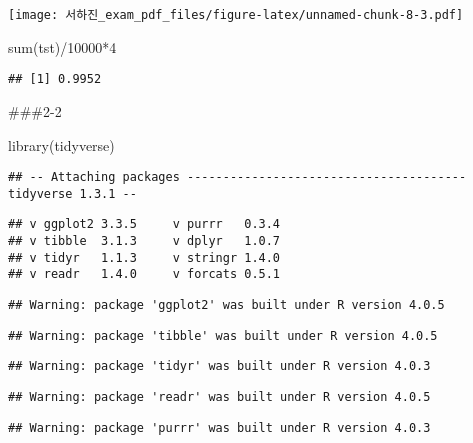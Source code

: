 \documentclass[
]{article}
\newenvironment{Shaded}{\begin{snugshade}}{\end{snugshade}}
\newcommand{\DecValTok}[1]{\textcolor[rgb]{0.00,0.00,0.81}{#1}}
\newcommand{\FunctionTok}[1]{\textcolor[rgb]{0.00,0.00,0.00}{#1}}
\newcommand{\NormalTok}[1]{#1}
\newcommand{\SpecialCharTok}[1]{\textcolor[rgb]{0.00,0.00,0.00}{#1}}
\begin{document}
\texttt{[image: 서하진\_exam\_pdf\_files/figure-latex/unnamed-chunk-8-3.pdf]}

\begin{Shaded}
\begin{Highlighting}[]
\FunctionTok{sum}\NormalTok{(tst)}\SpecialCharTok{/}\DecValTok{10000}\SpecialCharTok{*}\DecValTok{4}
\end{Highlighting}
\end{Shaded}

\begin{verbatim}
## [1] 0.9952
\end{verbatim}

\#\#\#2-2

\begin{Shaded}
\begin{Highlighting}[]
\FunctionTok{library}\NormalTok{(tidyverse)}
\end{Highlighting}
\end{Shaded}

\begin{verbatim}
## -- Attaching packages --------------------------------------- tidyverse 1.3.1 --
\end{verbatim}

\begin{verbatim}
## v ggplot2 3.3.5     v purrr   0.3.4
## v tibble  3.1.3     v dplyr   1.0.7
## v tidyr   1.1.3     v stringr 1.4.0
## v readr   1.4.0     v forcats 0.5.1
\end{verbatim}

\begin{verbatim}
## Warning: package 'ggplot2' was built under R version 4.0.5
\end{verbatim}

\begin{verbatim}
## Warning: package 'tibble' was built under R version 4.0.5
\end{verbatim}

\begin{verbatim}
## Warning: package 'tidyr' was built under R version 4.0.3
\end{verbatim}

\begin{verbatim}
## Warning: package 'readr' was built under R version 4.0.5
\end{verbatim}

\begin{verbatim}
## Warning: package 'purrr' was built under R version 4.0.3
\end{verbatim}
\end{document}
